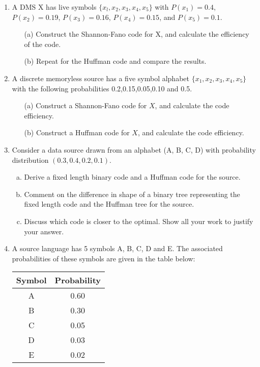 \documentclass[a4paper,12pt]{article}
\begin{document}
\begin{enumerate}

\item 
A DMS X has live symbols $\{x_l,x_2,x_3,x_4,x_5\}$ with $P(x_1) = 0.4$, $P(x_2)=0.19$, $P(x_3) =0.16$,
$P(x_4) = 0.15$, and $P(x_5) = 0.1$.
\begin{itemize}
\item[(a)] Construct the Shannon-Fano code for X, and calculate the efficiency of the code.
\item[(b)] Repeat for the Huffman code and compare the results.
\end{itemize}

\item A discrete memoryless source has a five symbol alphabet $\{x_1,x_2,x_3,x_4,x_5\}$ with the following probabilities 0.2,0.15,0.05,0.10 and 0.5.

\begin{itemize}
\item[(a)] Construct a Shannon-Fano code for $X$, and calculate the code efficiency.
\item[(b)] Construct a Huffman code for $X$, and calculate the code efficiency.
\end{itemize}

\item Consider a data source drawn from an alphabet (A, B, C, D) with probability
distribution $(0.3, 0.4, 0.2, 0.1)$.
\begin{enumerate}[(a)]
	\item Derive a fixed length binary code and a Huffman code for the source.
	\item Comment on the difference in shape of a binary tree representing the fixed
	length code and the Huffman tree for the source.
	\item Discuss which code is closer to the optimal. Show all your work to justify your
	answer.
\end{enumerate}
\item
A source language has 5 symbols A, B, C, D and E. The associated
probabilities of these symbols are given in the table below:
\begin{center}
	\begin{tabular}{|c|c|}
		\hline
		Symbol & Probability \\ \hline
		A & 0.60 \\
		B & 0.30 \\
		C & 0.05 \\
		D & 0.03 \\
		E & 0.02 \\
		\hline
	\end{tabular}
\end{center}


\end{enumerate}
\end{document}
